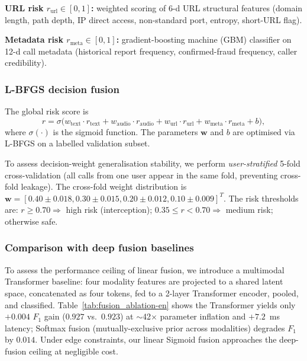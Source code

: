 \documentclass[11pt, a4paper]{article}
\begin{document}
\textbf{URL risk $r_{\mathrm{url}}\in[0,1]$:} weighted scoring of 6-d URL structural features (domain length, path depth, IP direct access, non-standard port, entropy, short-URL flag).

\textbf{Metadata risk $r_{\mathrm{meta}}\in[0,1]$:} gradient-boosting machine (GBM) classifier on 12-d call metadata (historical report frequency, confirmed-fraud frequency, caller credibility).

\subsubsection{L-BFGS decision fusion}

The global risk score is
\begin{equation}
r = \sigma\bigl(w_{\mathrm{text}}\cdot r_{\mathrm{text}} + w_{\mathrm{audio}}\cdot r_{\mathrm{audio}} + w_{\mathrm{url}}\cdot r_{\mathrm{url}} + w_{\mathrm{meta}}\cdot r_{\mathrm{meta}} + b\bigr),
\end{equation}
where $\sigma(\cdot)$ is the sigmoid function. The parameters $\mathbf{w}$ and $b$ are optimised via L-BFGS on a labelled validation subset.

To assess decision-weight generalisation stability, we perform \emph{user-stratified} 5-fold cross-validation (all calls from one user appear in the same fold, preventing cross-fold leakage). The cross-fold weight distribution is $\mathbf{w} = [0.40 \pm 0.018, 0.30 \pm 0.015, 0.20 \pm 0.012, 0.10 \pm 0.009]^T$. The risk thresholds are: $r\ge 0.70 \Rightarrow$ high risk (interception); $0.35\le r < 0.70 \Rightarrow$ medium risk; otherwise safe.

\subsubsection{Comparison with deep fusion baselines}

To assess the performance ceiling of linear fusion, we introduce a multimodal Transformer baseline: four modality features are projected to a shared latent space, concatenated as four tokens, fed to a 2-layer Transformer encoder, pooled, and classified. Table~\ref{tab:fusion_ablation-en} shows the Transformer yields only $+0.004$ $F_1$ gain ($0.927$ vs.\ $0.923$) at $\sim$42$\times$ parameter inflation and $+7.2$~ms latency; Softmax fusion (mutually-exclusive prior across modalities) degrades $F_1$ by $0.014$. Under edge constraints, our linear Sigmoid fusion approaches the deep-fusion ceiling at negligible cost.
\end{document}
